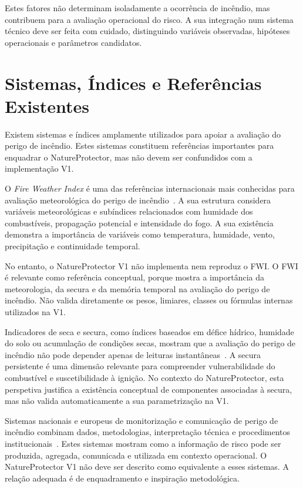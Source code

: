 Estes fatores não determinam isoladamente a ocorrência de incêndio, mas contribuem para a avaliação operacional do risco. A sua integração num sistema técnico deve ser feita com cuidado, distinguindo variáveis observadas, hipóteses operacionais e parâmetros candidatos.

\section{Sistemas, Índices e Referências Existentes}

Existem sistemas e índices amplamente utilizados para apoiar a avaliação do perigo de incêndio. Estes sistemas constituem referências importantes para enquadrar o NatureProtector, mas não devem ser confundidos com a implementação V1.

O \textit{Fire Weather Index} é uma das referências internacionais mais conhecidas para avaliação meteorológica do perigo de incêndio~\citep{nrcan_fwi_system,ipma_fwi}. A sua estrutura considera variáveis meteorológicas e subíndices relacionados com humidade dos combustíveis, propagação potencial e intensidade do fogo. A sua existência demonstra a importância de variáveis como temperatura, humidade, vento, precipitação e continuidade temporal.

No entanto, o NatureProtector V1 não implementa nem reproduz o FWI. O FWI é relevante como referência conceptual, porque mostra a importância da meteorologia, da secura e da memória temporal na avaliação do perigo de incêndio. Não valida diretamente os pesos, limiares, classes ou fórmulas internas utilizados na V1.

Indicadores de seca e secura, como índices baseados em défice hídrico, humidade do solo ou acumulação de condições secas, mostram que a avaliação do perigo de incêndio não pode depender apenas de leituras instantâneas~\citep{keetch_byram_1968}. A secura persistente é uma dimensão relevante para compreender vulnerabilidade do combustível e suscetibilidade à ignição. No contexto do NatureProtector, esta perspetiva justifica a existência conceptual de componentes associadas à secura, mas não valida automaticamente a sua parametrização na V1.

Sistemas nacionais e europeus de monitorização e comunicação de perigo de incêndio combinam dados, metodologias, interpretação técnica e procedimentos institucionais~\citep{ipma_fwi,ipma_pir_rcm,ec_jrc_effis,copernicus_effis}. Estes sistemas mostram como a informação de risco pode ser produzida, agregada, comunicada e utilizada em contexto operacional. O NatureProtector V1 não deve ser descrito como equivalente a esses sistemas. A relação adequada é de enquadramento e inspiração metodológica.


